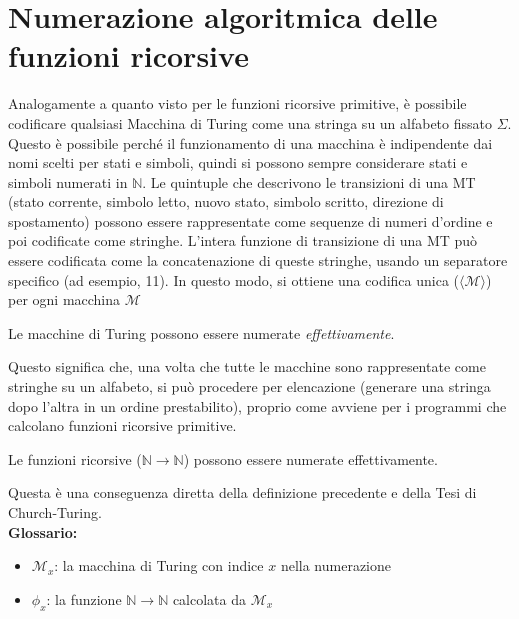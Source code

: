 \documentclass[12pt, a4paper]{report}
\begin{document}
        \section{Numerazione algoritmica delle funzioni ricorsive}
            Analogamente a quanto visto per le funzioni ricorsive primitive, è possibile codificare qualsiasi Macchina di Turing come una stringa su un alfabeto fissato $\Sigma$. Questo è possibile perché il funzionamento di una macchina è indipendente dai nomi scelti per stati e simboli, quindi si possono sempre considerare stati e simboli numerati in $\mathbb{N}$. Le quintuple che descrivono le transizioni di una MT (stato corrente, simbolo letto, nuovo stato, simbolo scritto, direzione di spostamento) possono essere rappresentate come sequenze di numeri d'ordine e poi codificate come stringhe. L'intera funzione di transizione di una MT può essere codificata come la concatenazione di queste stringhe, usando un separatore specifico (ad esempio, 11). In questo modo, si ottiene una codifica unica ($\langle\mathcal{M}\rangle$) per ogni macchina $\mathcal{M}$
            \begin{definitionbox}{}{}
                Le macchine di Turing possono essere numerate \textit{effettivamente}.
            \end{definitionbox}
            Questo significa che, una volta che tutte le macchine sono rappresentate come stringhe su un alfabeto, si può procedere per elencazione (generare una stringa dopo l'altra in un ordine prestabilito), proprio come avviene per i programmi che calcolano funzioni ricorsive primitive.
            \begin{definitionbox}{}{}
                Le funzioni ricorsive ($\mathbb{N}\to\mathbb{N}$) possono essere numerate effettivamente.
            \end{definitionbox}
            Questa è una conseguenza diretta della definizione precedente e della Tesi di Church-Turing.\\
            \textbf{Glossario:}
            \begin{itemize}
                \item $\mathcal{M}_x$: la macchina di Turing con indice $x$ nella numerazione
                \item $\phi_x$: la funzione $\mathbb{N}\to\mathbb{N}$ calcolata da $\mathcal{M}_x$
            \end{itemize}
\end{document}
